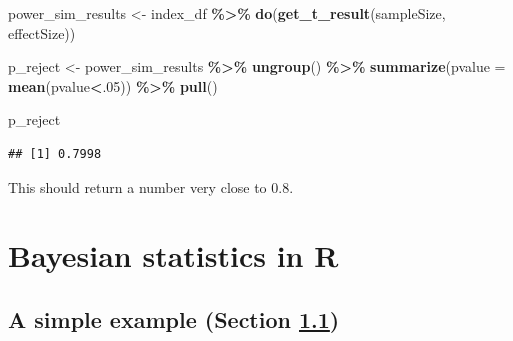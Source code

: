 \documentclass[
  12pt,
]{book}
\newenvironment{Shaded}{\begin{snugshade}}{\end{snugshade}}
\newcommand{\AttributeTok}[1]{\textcolor[rgb]{0.13,0.29,0.53}{#1}}
\newcommand{\DecValTok}[1]{\textcolor[rgb]{0.00,0.00,0.81}{#1}}
\newcommand{\FunctionTok}[1]{\textcolor[rgb]{0.13,0.29,0.53}{\textbf{#1}}}
\newcommand{\NormalTok}[1]{#1}
\newcommand{\OtherTok}[1]{\textcolor[rgb]{0.56,0.35,0.01}{#1}}
\newcommand{\SpecialCharTok}[1]{\textcolor[rgb]{0.81,0.36,0.00}{\textbf{#1}}}
\begin{document}
\begin{Shaded}
\begin{Highlighting}[]
\NormalTok{power\_sim\_results }\OtherTok{\textless{}{-}}\NormalTok{ index\_df }\SpecialCharTok{\%\textgreater{}\%}
  \FunctionTok{do}\NormalTok{(}\FunctionTok{get\_t\_result}\NormalTok{(sampleSize, effectSize))}

\NormalTok{p\_reject }\OtherTok{\textless{}{-}}
\NormalTok{  power\_sim\_results }\SpecialCharTok{\%\textgreater{}\%}
  \FunctionTok{ungroup}\NormalTok{() }\SpecialCharTok{\%\textgreater{}\%}
  \FunctionTok{summarize}\NormalTok{(}\AttributeTok{pvalue =} \FunctionTok{mean}\NormalTok{(pvalue}\SpecialCharTok{\textless{}}\NormalTok{.}\DecValTok{05}\NormalTok{)) }\SpecialCharTok{\%\textgreater{}\%}
  \FunctionTok{pull}\NormalTok{()}

\NormalTok{p\_reject}
\end{Highlighting}
\end{Shaded}

\begin{verbatim}
## [1] 0.7998
\end{verbatim}

This should return a number very close to 0.8.

\hypertarget{bayesian-statistics-in-r}{%
\chapter{Bayesian statistics in R}\label{bayesian-statistics-in-r}}

\hypertarget{doing-bayesian-estimation}{%
\section{A simple example (Section \ref{doing-bayesian-estimation})}\label{doing-bayesian-estimation}}
\end{document}
